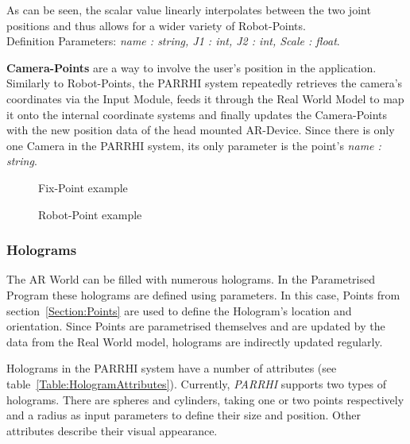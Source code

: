 As can be seen, the scalar value linearly interpolates between the two joint positions and thus allows for a wider variety of Robot-Points.\\Definition Parameters: \textit{name : string, J1 : int, J2 : int, Scale : float}.

\textbf{Camera-Points} are a way to involve the user's position in the application. Similarly to Robot-Points, the PARRHI system repeatedly retrieves the camera's coordinates via the Input Module, feeds it through the Real World Model to map it onto the internal coordinate systems and finally updates the Camera-Points with the new position data of the head mounted AR-Device. Since there is only one Camera in the PARRHI system, its only parameter is the point's \textit{name : string}.


\begin{figure}[!h]
	\begin{minipage}{0.45\textwidth}
		\centering
		
		\caption{Fix-Point example}
		\label{InputData:PointFix}
	\end{minipage}\hfill
	\begin{minipage}{0.45\textwidth}
		\centering
		
		\caption{Robot-Point example}
		\label{InputData:PointRobot}
	\end{minipage}
\end{figure}

\subsubsection{Holograms}\label{Section:Holograms}
The AR World can be filled with numerous holograms. In the Parametrised Program these holograms are defined using parameters. In this case, Points from section~\ref{Section:Points} are used to define the Hologram's location and orientation. Since Points are parametrised themselves and are updated by the data from the Real World model, holograms are indirectly updated regularly.

Holograms in the PARRHI system have a number of attributes (see table~\ref{Table:HologramAttributes}). Currently, \textit{PARRHI} supports two types of holograms. There are spheres and cylinders, taking one or two points respectively and a radius as input parameters to define their size and position. Other attributes describe their visual appearance.

